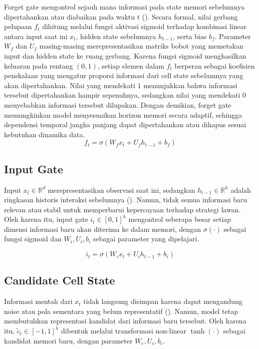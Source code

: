 Forget gate mengontrol sejauh mana informasi pada state memori sebelumnya dipertahankan atau diabaikan pada waktu $t$ (\cite{hochreiter_long_1997}). Secara formal, nilai gerbang pelupaan $f_t$ dihitung melalui fungsi aktivasi sigmoid terhadap kombinasi linear antara input saat ini $x_t$, hidden state sebelumnya $h_{t-1}$, serta bias $b_f$. Parameter $W_f$ dan $U_f$ masing-masing merepresentasikan matriks bobot yang memetakan input dan hidden state ke ruang gerbang. Karena fungsi sigmoid menghasilkan keluaran pada rentang $(0,1)$, setiap elemen dalam $f_t$ berperan sebagai koefisien penskalaan yang mengatur proporsi informasi dari cell state sebelumnya yang akan dipertahankan. Nilai yang mendekati $1$ menunjukkan bahwa informasi tersebut dipertahankan hampir sepenuhnya, sedangkan nilai yang mendekati $0$ menyebabkan informasi tersebut dilupakan. Dengan demikian, forget gate memungkinkan model menyesuaikan horizon memori secara adaptif, sehingga dependensi temporal jangka panjang dapat dipertahankan atau dihapus sesuai kebutuhan dinamika data.
\begin{equation}
f_t = \sigma(W_f x_t + U_f h_{t-1} + b_f)
\end{equation}

\subsection{Input Gate}

Input $x_t \in \mathbb{R}^d$ merepresentasikan observasi saat ini, sedangkan $h_{t-1} \in \mathbb{R}^h$ adalah ringkasan historis interaksi sebelumnya (\cite{hochreiter_long_1997}). Namun, tidak semua informasi baru relevan atau stabil untuk memperbarui kepercayaan terhadap strategi lawan. Oleh karena itu, input gate $i_t \in [0,1]^h$ mengontrol seberapa besar setiap dimensi informasi baru akan diterima ke dalam memori, dengan $\sigma(\cdot)$ sebagai fungsi sigmoid dan $W_i, U_i, b_i$ sebagai parameter yang dipelajari.

\begin{equation}
i_t = \sigma(W_i x_t + U_i h_{t-1} + b_i)
\end{equation}


\subsection{Candidate Cell State}

Informasi mentah dari $x_t$ tidak langsung disimpan karena dapat mengandung noise atau pola sementara yang belum representatif (\cite{hochreiter_long_1997}). Namun, model tetap membutuhkan representasi kandidat dari informasi baru tersebut. Oleh karena itu, $\tilde{c}_t \in [-1,1]^h$ dibentuk melalui transformasi non-linear $\tanh(\cdot)$ sebagai kandidat memori baru, dengan parameter $W_c, U_c, b_c$.

